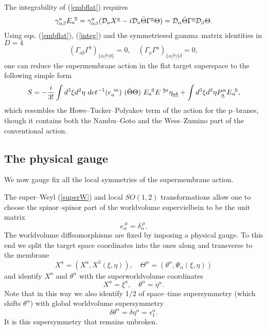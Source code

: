 \documentclass[a4paper,12pt]{article}
\begin{document}
The integrability of (\ref{embflat}) requires
\begin{equation}\label{integ}
\gamma^a_{\alpha\beta}{E}^{~\underline a}_a
=\gamma^a_{\alpha\beta}({\cal D}_a X^{\underline a} -i{\cal
D}_a\bar\Theta\Gamma^{\underline a}\Theta)={\cal
D}_\alpha\bar\Theta\Gamma^{\underline a}{\cal D}_\beta\Theta.
\end{equation}
Using eqs. (\ref{embflat}), (\ref{integ}) and the symmetriesed
gamma--matrix identities in $D=4$
\begin{equation}\label{gammai}
(\Gamma_{\underline{ab}}\Gamma^{\underline
b})_{\{\underline\alpha\underline\beta\underline\gamma\underline\delta\}}=0,
\quad
(\Gamma_{\underline{a}}\Gamma^{\underline
a})_{\{\underline\alpha\underline\beta\underline\gamma\underline\}\delta}=0,
\end{equation}
one can reduce the supermembrane action in the flat target
superspace to the following simple form
\begin{equation}\label{a2d4p}
S=-{i\over{3!}}\int d^3\xi
d^2\eta~det^{-1}(e^{~m}_a)~(\bar\Theta\Theta)~{ E}^{~\underline
a}_a{E}^{~\underline b a}\eta_{\underline a\underline b}+\int
d^3\xi d^2\eta P^\alpha_{\underline a}{E}^{~\underline
a}_{\alpha},
\end{equation}
which resembles the Howe--Tucker--Polyakov term of the action for
the p--branes, though it contains both the Nambu--Goto and the
Wess--Zumino part of the conventional action.

\subsection{The physical gauge}
We now gauge fix all the local symmetries of the supermembrane
action.

The super--Weyl (\ref{superW}) and local $SO(1,2)$ transformations
 allow one to choose the spinor--spinor part of the worldvolume
 supervielbein to be the unit matrix
 $$
 e^{~\mu}_\alpha=\delta^{~\mu}_\alpha.
 $$
 The worldvolume diffeomorphisms are fixed by imposing a physical
 gauge. To this end we split the target space coordinates into the
 ones along and transverse to the membrane
 \begin{equation}\label{split}
 X^{\underline a}=(X^a, X^3(\xi,\eta)), \quad
 \Theta^{\underline\alpha}=(\theta^\alpha,\Psi_\alpha(\xi,\eta))
 \end{equation}
and identify $X^a$ and $\theta^\alpha$ with the superworldvolume
coordinates
\begin{equation}\label{physg}
X^a=\xi^a, \quad \theta^\alpha=\eta^\alpha.
\end{equation}
Note that in this way we also identify 1/2 of space--time
supersymmetry (which shifts $\theta^\alpha$) with global
worldvolume supersymmetry
\begin{equation}\label{susy1}
\delta\theta^\alpha=\delta\eta^\alpha=\epsilon^\alpha_1.
\end{equation}
It is this supersymmetry that remains unbroken.
\end{document}
